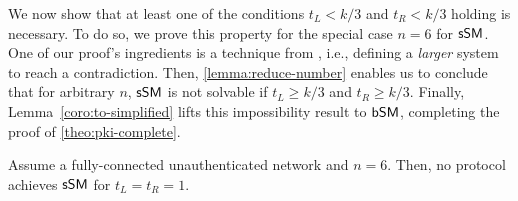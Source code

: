 We now show that at least one of the conditions $t_L < k / 3$ and $t_R < k / 3$ holding is necessary. To do so, we prove this property for the special case $n=6$ for $\textsf{sSM}$. One of our proof's ingredients is a technique from \cite{PODC:FisLynMer85}, i.e., defining a \emph{larger} system to reach a contradiction. 
Then, \cref{lemma:reduce-number} enables us to conclude that for arbitrary $n$, $\textsf{sSM}$ is not solvable if  $t_L \geq k/3$ and $t_R \geq k/3$. Finally, Lemma~\ref{coro:to-simplified} lifts this impossibility result to $\textsf{bSM}$, completing the proof of \cref{theo:pki-complete}.
\begin{lemma}\label{lemma:pki-6}
Assume a fully-connected unauthenticated network and $n = 6$. Then, no protocol achieves $\textsf{sSM}$ for $t_L = t_R = 1$.
\end{lemma}
